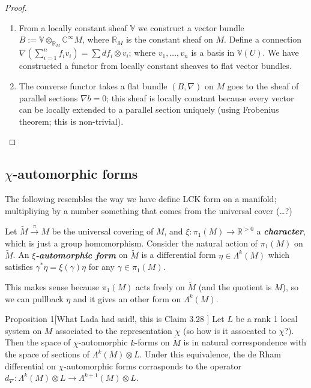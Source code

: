 \begin{proof}\leavevmode
\begin{enumerate}[label=\textbf{Step \arabic*}]
\item From a locally constant sheaf \(\mathbb{V}\) we construct a vector bundle \(B:=\mathbb{V} \otimes_{\mathbb{R}_M}\mathbb{C}^\infty M\), where \(\mathbb{R}_M\) is the constant sheaf on \(M\). Define a connection \(\nabla\left(\sum_{i=1}^n f_iv_i\right) =\sum df_i \otimes v_i\); where \(v_1,\ldots,v_n\) is a basis in \(\mathbb{V}(U)\). {\color{5}We have constructed a functor from locally constant sheaves to flat vector bundles.}

\item The converse functor takes a flat bundle \((B,\nabla)\) on \(M\) goes to the sheaf of parallel sections \(\nabla b=0\); this sheaf is  locally constant because every vector can be locally extended to a parallel section uniquely (using Frobenius theorem; this is non-trivial).
\end{enumerate}
\end{proof}

\subsection{\(\chi\)-automorphic forms}

The following resembles the way we have define LCK form on a manifold; multipliying by a number something that comes from the universal cover (…?)

\begin{defn}\leavevmode
	Let \(\tilde{M} \xrightarrow{\pi}M\) be the universal covering of \(M\), and \(\xi:\pi_1(M) \to \mathbb{R}^{>0}\) a \textit{\textbf{character}}, which is just a group homomorphism. Consider the natural action of \(\pi_1(M)\) on \(\tilde{M}\). An \textit{\textbf{\(\xi\)-automorphic form}} on \(\tilde{M}\) is a differential form \(\eta \in \Lambda^{k}(M)\) which satisfies \(\gamma^* \eta=\xi(\gamma)\eta\) for any \(\gamma \in \pi_{1}(M)\).

	This makes sense because \(\pi_1(M)\) acts freely on \(\tilde{M}\) (and the quotient is \(M\)), so we can pullback \(\eta\) and it gives an other form on \(\Lambda^{k}(M)\).
\end{defn}

\begin{thing6}{Proposition 1}[What Lada had said!, this is Claim 3.28 \cite{verbi}]\leavevmode
Let \(L\) be a rank 1 local system on \(M\) {\color{3}associated to the representation \(\chi\) (so how is it assocated to \(\chi\)?)}. Then the space of \(\chi\)-automorphic \(k\)-forms on \(\tilde{M}\) is in natural correspondence with the space of sections of \(\Lambda^{k}(M)\otimes L\). Under this equivalence, the de Rham differential on \(\chi\)-automorphic forms corrasponds to the operator \(d_\nabla: \Lambda^{k}(M)\otimes L \to \Lambda^{k+1}(M)\otimes L\).
\end{thing6}

